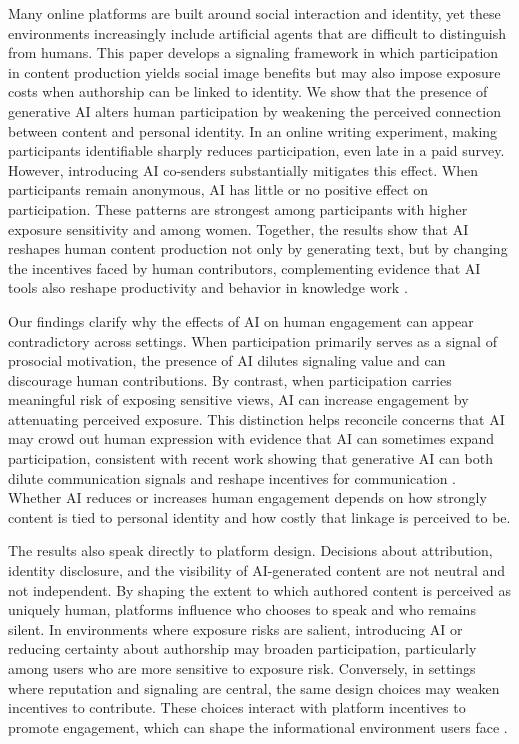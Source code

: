 \documentclass[12pt,notitlepage]{article}
\theoremstyle{plain}
\theoremstyle{plain}
\theoremstyle{definition}
\theoremstyle{definition}
\theoremstyle{assumption}
\theoremstyle{plain}
\theoremstyle{plain}
\theoremstyle{plain}
\theoremstyle{plain}
\theoremstyle{definition}%
\theoremstyle{plain}
\theoremstyle{plain}
\theoremstyle{plain}
\theoremstyle{plain}
\begin{document}
Many online platforms are built around social interaction and identity, yet these environments increasingly include artificial agents that are difficult to distinguish from humans. This paper develops a signaling framework in which participation in content production yields social image benefits but may also impose exposure costs when authorship can be linked to identity. We show that the presence of generative AI alters human participation by weakening the perceived connection between content and personal identity. In an online writing experiment, making participants identifiable sharply reduces participation, even late in a paid survey. However, introducing AI co-senders substantially mitigates this effect. When participants remain anonymous, AI has little or no positive effect on participation. These patterns are strongest among participants with higher exposure sensitivity and among women. Together, the results show that AI reshapes human content production not only by generating text, but by changing the incentives faced by human contributors, complementing evidence that AI tools also reshape productivity and behavior in knowledge work \citep{noy2023experimental,brynjolfsson2024generative,mehmood2026courts}.

Our findings clarify why the effects of AI on human engagement can appear contradictory across settings. When participation primarily serves as a signal of prosocial motivation, the presence of AI dilutes signaling value and can discourage human contributions. By contrast, when participation carries meaningful risk of exposing sensitive views, AI can increase engagement by attenuating perceived exposure. This distinction helps reconcile concerns that AI may crowd out human expression with evidence that AI can sometimes expand participation, consistent with recent work showing that generative AI can both dilute communication signals and reshape incentives for communication \citep{cowgill2024cheapen,cui2025signaling,galdin2025making}. Whether AI reduces or increases human engagement depends on how strongly content is tied to personal identity and how costly that linkage is perceived to be.

The results also speak directly to platform design. Decisions about attribution, identity disclosure, and the visibility of AI-generated content are not neutral and not independent. By shaping the extent to which authored content is perceived as uniquely human, platforms influence who chooses to speak and who remains silent. In environments where exposure risks are salient, introducing AI or reducing certainty about authorship may broaden participation, particularly among users who are more sensitive to exposure risk. Conversely, in settings where reputation and signaling are central, the same design choices may weaken incentives to contribute. These choices interact with platform incentives to promote engagement, which can shape the informational environment users face \citep{siderius2023,cookson2024}.
\end{document}

